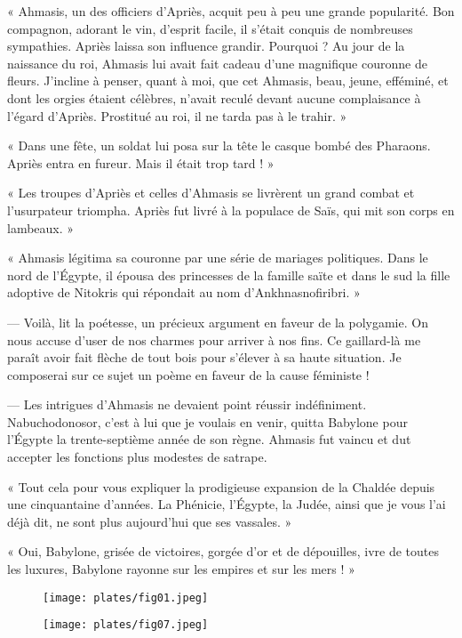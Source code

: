 \documentclass[a4paper, 11pt, oneside, polutonikogreek, french]{article}
\begin{document}
« Ahmasis, un des officiers d'Apriès, acquit peu à peu une grande popularité. Bon compagnon, adorant le vin, d'esprit facile, il s'était conquis de nombreuses sympathies. Apriès laissa son influence grandir. Pourquoi ? Au jour de la naissance du roi, Ahmasis lui avait fait cadeau d'une magnifique couronne de fleurs. J'incline à penser, quant à moi, que cet Ahmasis, beau, jeune, efféminé, et dont les orgies étaient célèbres, n'avait reculé devant aucune complaisance à l'égard d'Apriès. Prostitué au roi, il ne tarda pas à le trahir. »

« Dans une fête, un soldat lui posa sur la tête le casque bombé des Pharaons. Apriès entra en fureur. Mais il était trop tard ! »

« Les troupes d'Apriès et celles d'Ahmasis se livrèrent un grand combat et l'usurpateur triompha. Apriès fut livré à la populace de Saïs, qui mit son corps en lambeaux. »

« Ahmasis légitima sa couronne par une série de mariages politiques. Dans le nord de l'Égypte, il épousa des princesses de la famille saïte et dans le sud la fille adoptive de Nitokris qui répondait au nom d'Ankhnasnofiribri. »

--- Voilà, lit la poétesse, un précieux argument en faveur de la polygamie. On nous accuse d'user de nos charmes pour arriver à nos fins. Ce gaillard-là me paraît avoir fait flèche de tout bois pour s'élever à sa haute situation. Je composerai sur ce sujet un poème en faveur de la cause féministe !

--- Les intrigues d'Ahmasis ne devaient point réussir indéfiniment. Nabuchodonosor, c'est à lui que je voulais en venir, quitta Babylone pour l'Égypte la trente-septième année de son règne. Ahmasis fut vaincu et dut accepter les fonctions plus modestes de satrape.

« Tout cela pour vous expliquer la prodigieuse expansion de la Chaldée depuis une cinquantaine d'années. La Phénicie, l'Égypte, la Judée, ainsi que je vous l'ai déjà dit, ne sont plus aujourd'hui que ses vassales. »

« Oui, Babylone, grisée de victoires, gorgée d'or et de dépouilles, ivre de toutes les luxures, Babylone rayonne sur les empires et sur les mers ! »

\begin{figure}[H]
\centering
\texttt{[image: plates/fig01.jpeg]}
\end{figure}
\clearpage
\begin{figure}[H]
\centering
\texttt{[image: plates/fig07.jpeg]}
\end{figure}
\end{document}
